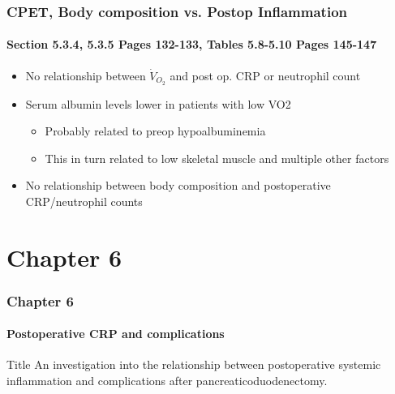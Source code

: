 \documentclass[10pt]{beamer}
\begin{document}
\begin{frame}
	\frametitle{CPET, Body composition vs. Postop Inflammation }
	\framesubtitle{Section 5.3.4, 5.3.5 Pages 132-133, Tables 5.8-5.10 Pages 145-147 }
	\begin{itemize}
		\item No relationship between $\dot{V}_{O_2}$ and post op. CRP or neutrophil count
		\vfill
		\item Serum albumin levels lower in patients with low VO2
		\begin{itemize}
			\item Probably related to preop hypoalbuminemia
			\item This in turn related to low skeletal muscle and multiple other factors
		\end{itemize}
		\vfill
		\item No relationship between body composition and postoperative CRP/neutrophil counts
	\end{itemize}
\end{frame}


\section{Chapter 6}
\begin{frame}
	\frametitle{Chapter 6}
	\framesubtitle{Postoperative CRP and complications}
	\begin{block}{Title}
		An investigation into the relationship between postoperative systemic inflammation and complications after pancreaticoduodenectomy.
	\end{block}
\end{frame}
\end{document}
